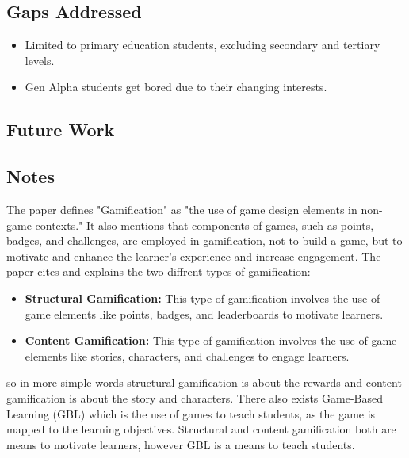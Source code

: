 \subsection{Gaps Addressed}
\begin{itemize}
    \item Limited to primary education students, excluding secondary and tertiary levels.
    \item Gen Alpha students get bored due to their changing interests.
\end{itemize}

\subsection{Future Work}

\subsection{Notes} 
The paper defines "Gamification" as "the use of game design elements in non-game contexts." 
It also mentions that components of games, such as points, badges, and challenges, 
are employed in gamification, not to build a game, 
but to motivate and enhance the learner's experience and increase engagement.
The paper cites and explains the two diffrent types of gamification:
\begin{itemize}
    \item \textbf{Structural Gamification:} This type of gamification involves the use of game elements like points, badges, and leaderboards to motivate learners.
    \item \textbf{Content Gamification:} This type of gamification involves the use of game elements like stories, characters, and challenges to engage learners.
\end{itemize}
so in more simple words structural gamification is about the rewards and content gamification is about the story and characters.
There also exists Game-Based Learning (GBL) which is the use of games to teach students, 
as the game is mapped to the learning objectives.
Structural and content gamification both are means to motivate learners, however GBL is a means to teach students.